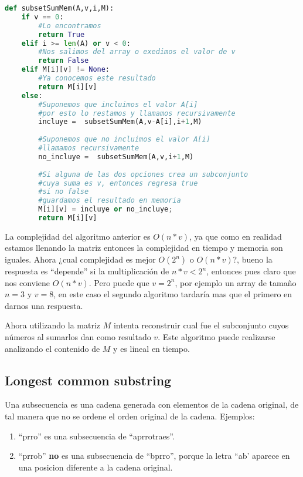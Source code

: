 \begin{lstlisting}[language=Python, caption=Subset sum programacion dinamica]
def subsetSumMem(A,v,i,M):
    if v == 0:
        #Lo encontramos
        return True
    elif i >= len(A) or v < 0:
        #Nos salimos del array o exedimos el valor de v
        return False
    elif M[i][v] != None:
        #Ya conocemos este resultado
        return M[i][v]
    else:
        #Suponemos que incluimos el valor A[i]
        #por esto lo restamos y llamamos recursivamente
        incluye =  subsetSumMem(A,v-A[i],i+1,M)
        
        #Suponemos que no incluimos el valor A[i]
        #llamamos recursivamente
        no_incluye =  subsetSumMem(A,v,i+1,M)
        
        #Si alguna de las dos opciones crea un subconjunto
        #cuya suma es v, entonces regresa true
        #si no false
        #guardamos el resultado en memoria
        M[i][v] = incluye or no_incluye;
        return M[i][v] 
\end{lstlisting}
 
 La complejidad del algoritmo anterior es $O(n*v)$, ya que como en realidad estamos llenando la matriz entonces la complejidad en tiempo y memoria son iguales. Ahora ¿cual complejidad es mejor $O(2^n)$ o $O(n*v)$?, bueno la respuesta es ``depende'' si la multiplicación de $n*v < 2^n$, entonces pues claro que nos conviene $O(n*v)$. Pero puede que $v=2^n$, por ejemplo un array de tamaño $n=3$ y $v=8$, en este caso el segundo algoritmo tardaría mas que el primero en darnos una respuesta. 
 
 Ahora utilizando la matriz $M$ intenta reconstruir cual fue el subconjunto cuyos números al sumarlos dan como resultado $v$. Este algoritmo puede realizarse analizando el contenido de $M$ y es lineal en tiempo.
 
 \subsection{Longest common substring}
 
 Una subsecuencia es una cadena generada con elementos de la cadena original, de tal manera que no se ordene el orden original de la cadena. Ejemplos:
 
 \begin{enumerate}
     \item ``prro'' es una subsecuencia de ``aprrotraes''.
     \item ``prrob'' \textbf{no} es una subsecuencia de ``bprro'', porque la letra ``ab' aparece en una posicion diferente a la cadena original.
 \end{enumerate}
 
